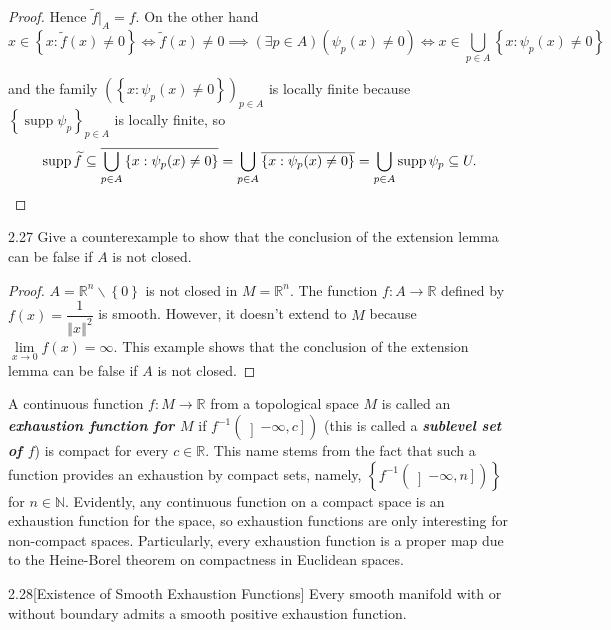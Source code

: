 \begin{proof}
    Hence \( \widetilde{f}\vert_{A} = f \). On the other hand
    \[
        x \in \left\{ x: \widetilde{f}(x) \ne 0 \right\} \iff \widetilde{f}(x) \ne 0 \implies (\exists p \in A)( \psi_{p}(x) \ne 0 ) \iff x \in \bigcup_{p \in A} \left\{ x: \psi_{p}(x) \ne 0 \right\}
    \]

    and the family \( {(\left\{ x: \psi_{p}(x) \ne 0 \right\})}_{p \in A} \) is locally finite because \( {\left\{ \operatorname{supp} \psi_{p} \right\}}_{p \in A} \) is locally finite, so
    \[
        \operatorname{supp} \widetilde{f} \subseteq \overline{\bigcup_{p \in A} \left\{ x: \psi_{p}(x) \ne 0 \right\}} = \bigcup_{p \in A} \overline{\left\{ x: \psi_{p}(x) \ne 0 \right\}} = \bigcup_{p \in A} \operatorname{supp} \psi_{p} \subseteq U. \qedhere
    \]
\end{proof}

\begin{exercise}{2.27}
    Give a counterexample to show that the conclusion of the extension lemma can be false if \( A \) is not closed.
\end{exercise}

\begin{proof}
    \( A = \mathbb{R}^{n} \smallsetminus \left\{ 0 \right\} \) is not closed in \( M = \mathbb{R}^{n} \). The function \( f: A \to \mathbb{R} \) defined by \( f(x) = \dfrac{1}{{\left\Vert x \right\Vert}^{2}} \) is smooth. However, it doesn't extend to \( M \) because \( \lim\limits_{x \to 0} f(x) = \infty \). This example shows that the conclusion of the extension lemma can be false if \(A\) is not closed.
\end{proof}

A continuous function \( f: M \to \mathbb{R} \) from a topological space \( M \) is called an \emph{\textbf{exhaustion function for \( M \)}} if \( f^{-1}(\left\rbrack -\infty, c\right\rbrack) \) (this is called a \emph{\textbf{sublevel set of \( f \)}}) is compact for every \( c \in \mathbb{R} \). This name stems from the fact that such a function provides an exhaustion by compact sets, namely, \( \left\{ f^{-1}(\left\rbrack -\infty, n \right\rbrack) \right\} \) for \( n \in \mathbb{N} \). Evidently, any continuous function on a compact space is an exhaustion function for the space, so exhaustion functions are only interesting for non-compact spaces. Particularly, every exhaustion function is a proper map due to the Heine-Borel theorem on compactness in Euclidean spaces.

\begin{theorem}{2.28}[Existence of Smooth Exhaustion Functions]
    Every smooth manifold with or without boundary admits a smooth positive exhaustion function.
\end{theorem}

